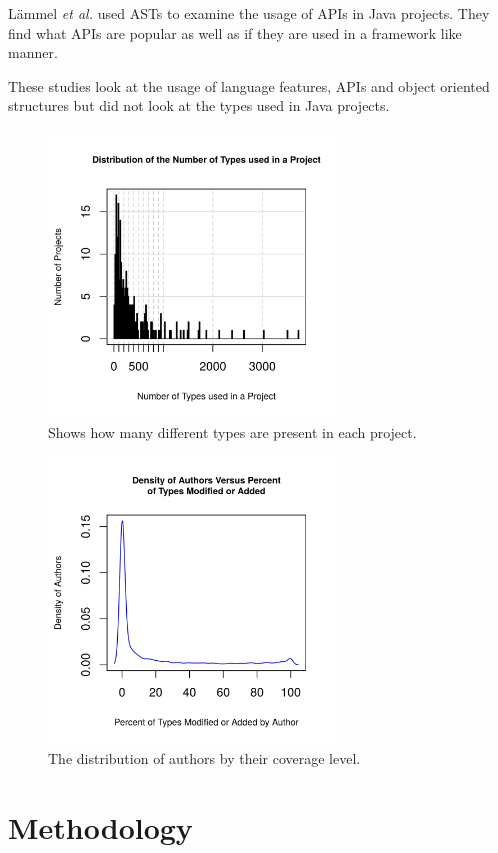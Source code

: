 \documentclass{sig-alternate-05-2015}
\begin{document}
L\"{a}mmel \textit{et al.} \cite{Lammel:2011:LAA:1982185.1982471} used ASTs to examine the usage of APIs in Java projects. They find what APIs are popular as well as if they are used in a framework like manner. 

These studies look at the usage of language features, APIs and object oriented structures but did not look at the types used in Java projects.

\begin{figure}[t]
\centering
\includegraphics[height=3in, width=3in]{../lib_stats_number_of_libraries_dist}
\caption{Shows how many different types are present in each project.}
\label{lib_stats_number_of_libraries_dist}
\end{figure}

\begin{figure}[t]
\centering
\includegraphics[height=3in, width=3in]{../lib_stats_dist}
\caption{The distribution of authors by their coverage level.}
\label{lib_stats_dist}
\end{figure}

\section{Methodology}
\end{document}
